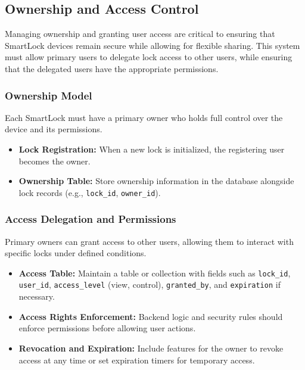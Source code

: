 \newpage
\subsection{Ownership and Access Control}

Managing ownership and granting user access are critical to ensuring that SmartLock devices remain secure while allowing for flexible sharing. This system must allow primary users to delegate lock access to other users, while ensuring that the delegated users have the appropriate permissions.

\subsubsection{Ownership Model}

Each SmartLock must have a primary owner who holds full control over the device and its permissions.

\begin{itemize}
  \item \textbf{Lock Registration:} When a new lock is initialized, the registering user becomes the owner.
  \item \textbf{Ownership Table:} Store ownership information in the database alongside lock records (e.g., \texttt{lock\_id}, \texttt{owner\_id}).
\end{itemize}

\subsubsection{Access Delegation and Permissions}

Primary owners can grant access to other users, allowing them to interact with specific locks under defined conditions.

\begin{itemize}
  \item \textbf{Access Table:} Maintain a table or collection with fields such as \texttt{lock\_id}, \texttt{user\_id}, \texttt{access\_level} (view, control), \texttt{granted\_by}, and \texttt{expiration} if necessary.
  \item \textbf{Access Rights Enforcement:} Backend logic and security rules should enforce permissions before allowing user actions.
  \item \textbf{Revocation and Expiration:} Include features for the owner to revoke access at any time or set expiration timers for temporary access.
\end{itemize}

